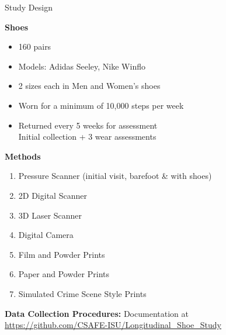 \documentclass[landscape, a0paper, fontscale=0.275, margin = 30mm]{baposter} %
\newcommand{\headercolorbox}[4]{%
  \begin{posterbox}[#3,borderColor=#2,headerColorOne=#2,headerColorTwo=#2]{#1}
    #4
  \end{posterbox}
}
\begin{document}
\begin{poster}
\headercolorbox{Study Design}{csafelightblue}{name=objectives,column=0,row=0}{
{\bf Shoes}
\begin{itemize}
\item 160 pairs
\item Models: Adidas Seeley, Nike Winflo
\item 2 sizes each in Men and Women's shoes
\item Worn for a minimum of 10,000 steps per week
\item Returned every 5 weeks for assessment\\Initial collection + 3 wear assessments
\end{itemize}
\vspace{1em}
{\bf Methods}
\begin{enumerate}
\item Pressure Scanner {\small(initial visit, barefoot \& with shoes)}
\item 2D Digital Scanner
\item 3D Laser Scanner
\item Digital Camera
\item Film and Powder Prints
\item Paper and Powder Prints
\item Simulated Crime Scene Style Prints
\end{enumerate}
\vspace{1em}
{\bf Data Collection Procedures:}
Documentation at \\{\small\url{https://github.com/CSAFE-ISU/Longitudinal_Shoe_Study}}
}



\end{poster}
\end{document}
